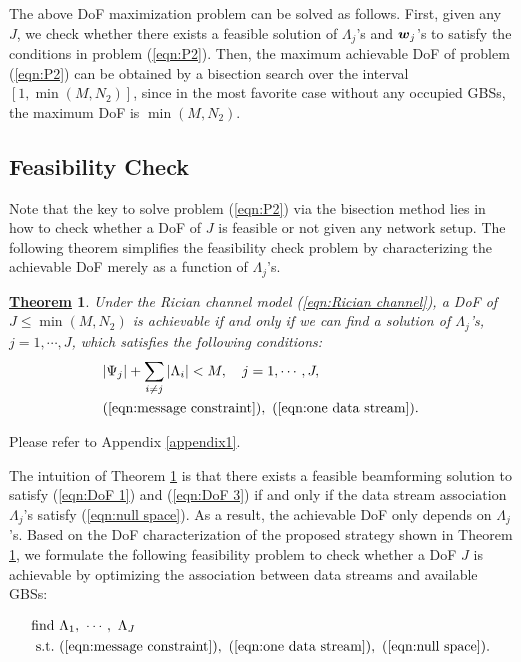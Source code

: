 \documentclass[onecolumn, draftclsnofoot, 12pt]{IEEEtran}
\newtheorem{theorem}{\underline{Theorem}}
\newcommand{\mv}[1]{\mbox{\boldmath{$ #1 $}}}
\begin{document}
The above DoF maximization problem can be solved as follows. First, given any $J$, we check whether there exists a feasible solution of $\Lambda_j$'s and $\mv{w}_j$'s to satisfy the conditions in problem (\ref{eqn:P2}). Then, the maximum achievable DoF of problem (\ref{eqn:P2}) can be obtained by a bisection search over the interval $[1,\min(M,N_2)]$, since in the most favorite case without any occupied GBSs, the maximum DoF is $\min(M,N_2)$.

\subsection{Feasibility Check}
Note that the key to solve problem (\ref{eqn:P2}) via the bisection method lies in how to check whether a DoF of $J$ is feasible or not given any network setup. The following theorem simplifies the feasibility check problem by characterizing the achievable DoF merely as a function of $\Lambda_j$'s.

\begin{theorem}\label{theorem1}
Under the Rician channel model (\ref{eqn:Rician channel}), a DoF of $J\leq \min(M,N_2)$ is achievable if and only if we can find a solution of $\Lambda_j$'s, $j=1,\cdots,J$, which satisfies the following conditions:
\begin{align}
& |\Psi_j|+\sum\limits_{i\neq j}|\Lambda_i|<M, ~~~ j=1,\cdots,J, \label{eqn:null space} \\
& ({\rm \ref{eqn:message constraint}}), ~ ({\rm \ref{eqn:one data stream}}). \nonumber
\end{align}
\end{theorem}


\begin{IEEEproof}
Please refer to Appendix \ref{appendix1}.
\end{IEEEproof}

The intuition of Theorem \ref{theorem1} is that there exists a feasible beamforming solution to satisfy (\ref{eqn:DoF 1}) and (\ref{eqn:DoF 3}) if and only if the data stream association $\Lambda_j$'s satisfy (\ref{eqn:null space}). As a result, the achievable DoF only depends on $\Lambda_j$'s. Based on the DoF characterization of the proposed strategy shown in Theorem \ref{theorem1}, we formulate the following feasibility problem to check whether a DoF $J$ is achievable by optimizing the association between data streams and available GBSs:

\begin{subequations}\label{eqn:P3}\begin{align}
\mathop{\mathrm{find}} & ~ \Lambda_1, ~ \cdots, ~ \Lambda_J  \\
\mathrm{s.t.} & ~ ({\rm \ref{eqn:message constraint}}), ~ ({\rm \ref{eqn:one data stream}}), ~ ({\rm \ref{eqn:null space}}).
\end{align}\end{subequations}
\end{document}
